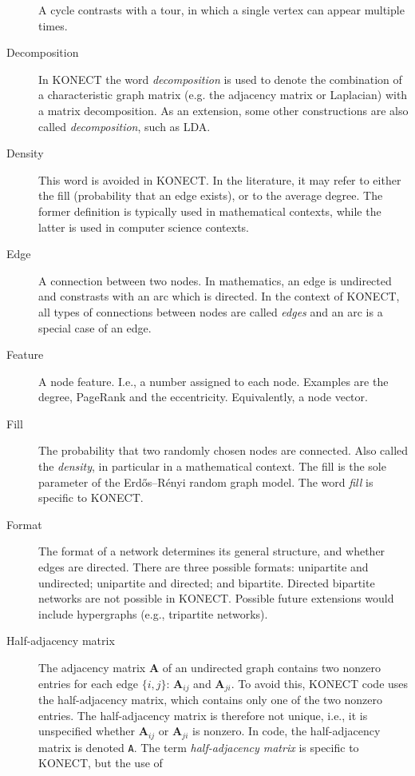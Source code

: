\documentclass{article}
\begin{document}
\begin{description}
    A cycle contrasts with a tour, in which a single vertex can appear
    multiple times.  
  \item[Decomposition] In KONECT the word \emph{decomposition} is used
    to denote the combination of a characteristic graph matrix (e.g. the
    adjacency matrix or Laplacian) with a matrix decomposition.  As an
    extension, some other constructions are also called
    \emph{decomposition}, such as LDA.
  \item[Density] This word is avoided in KONECT.  In the literature, it
    may refer to either the fill (probability that an edge exists), or to
    the average degree.  The former definition is typically used in mathematical
    contexts, while the latter is used in computer science contexts.
  \item[Edge] A connection between two nodes.  In mathematics, an edge
    is undirected and constrasts with an arc which is directed.  In the
    context of KONECT, all types of connections between nodes are called
    \emph{edges} and an arc is a special case of an edge. 
  \item[Feature] A node feature. I.e., a number assigned to each node.
    Examples are the degree, PageRank and the eccentricity. 
    Equivalently, a node vector.
  \item[Fill] The probability that two randomly chosen nodes are
    connected.  Also called the \emph{density}, in particular in a
    mathematical context.  The fill is the sole parameter of the
    Erdős--Rényi random graph model.  The word \emph{fill} is specific
    to KONECT. 
  \item[Format] 
    The format of a network determines its general structure, and
    whether edges are directed.  There are three possible formats:
    unipartite and undirected; unipartite and directed; and bipartite.
    Directed bipartite networks are not possible in KONECT.  Possible future
    extensions would include hypergraphs (e.g., tripartite networks).  
  \item[Half-adjacency matrix]
    The adjacency matrix $\mathbf A$ of an undirected graph contains two
    nonzero entries for each edge $\{i,j\}$:  $\mathbf A_{ij}$ and
    $\mathbf A_{ji}$.  To avoid this, KONECT code uses the
    half-adjacency matrix, which contains only one of the two nonzero
    entries.  The half-adjacency matrix is therefore not unique, i.e.,
    it is unspecified whether $\mathbf A_{ij}$ or $\mathbf A_{ji}$ is nonzero.  In
    code, the half-adjacency matrix is denoted \texttt{A}.  The term
    \emph{half-adjacency matrix} is specific to KONECT, but the use of

\end{description}
\end{document}
